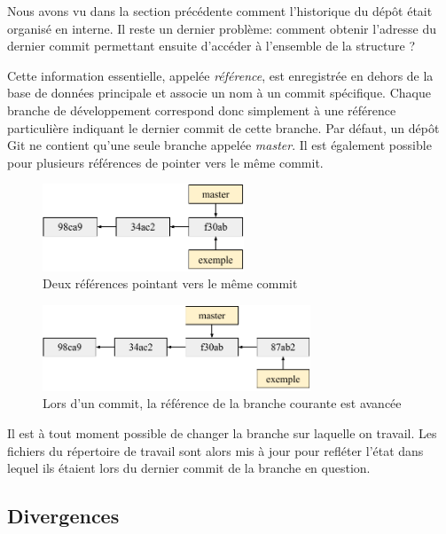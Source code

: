\documentclass[11pt,a4paper]{article}
\begin{document}
Nous avons vu dans la section précédente comment l'historique du dépôt était organisé en interne. Il reste un dernier problème: comment obtenir l'adresse du dernier commit permettant ensuite d'accéder à l'ensemble de la structure ?

Cette information essentielle, appelée \textit{référence}, est enregistrée en dehors de la base de données principale et associe un nom à un commit spécifique. Chaque branche de développement correspond donc simplement à une référence particulière indiquant le dernier commit de cette branche. Par défaut, un dépôt Git ne contient qu'une seule branche appelée \textit{master}. Il est également possible pour plusieurs références de pointer vers le même commit.

\begin{figure}[h]
\begin{center}
\includegraphics[width=6cm]{img_refs}
\caption{Deux références pointant vers le même commit}
\end{center}
\end{figure}


\begin{figure}[h]
\begin{center}
\includegraphics[width=8cm]{img_refs2}
\caption{Lors d'un commit, la référence de la branche courante est avancée}
\end{center}
\end{figure}

Il est à tout moment possible de changer la branche sur laquelle on travail. Les fichiers du répertoire de travail sont alors mis à jour pour refléter l'état dans lequel ils étaient lors du dernier commit de la branche en question.

\subsection{Divergences}
\end{document}
